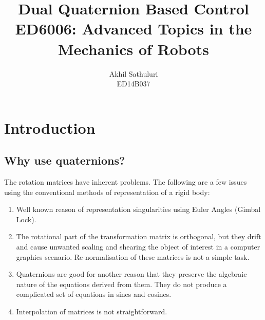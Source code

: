 \documentclass[a4paper,12pt]{article}
\date{}
\title{Dual Quaternion Based Control\\ED6006: Advanced Topics in the Mechanics of Robots}
\author{Akhil Sathuluri\\ ED14B037}
\begin{document}
%
\maketitle %
\section{Introduction}

\subsection{Why use quaternions?}
The rotation matrices have inherent problems. The following are a few issues using the conventional methods of representation of a rigid body:
\begin{enumerate}
	\item Well known reason of representation singularities using Euler Angles (Gimbal Lock).
	\item The rotational part of the transformation matrix is orthogonal, but they drift and cause unwanted scaling and shearing the object of interest in a computer graphics scenario\cite{ken2012beginners}. Re-normalisation of these matrices is not a simple task. 
	\item Quaternions are good for another reason that they preserve the algebraic nature of the equations derived from them. They do not produce a complicated set of equations in sines and cosines.
	\item Interpolation of matrices is not straightforward.
\end{enumerate}
\end{document}
